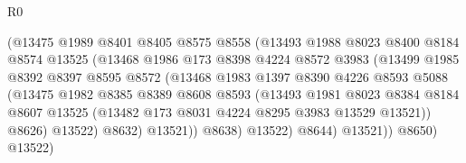 \begin{lexlean}{R0}
\begin{coremodule}
                                (@13475
                                  @1989
                                  @8401
                                  @8405
                                  @8575
                                  @8558
                                  (@13493
                                    @1988
                                    @8023
                                    @8400
                                    @8184
                                    @8574
                                    @13525
                                    (@13468
                                      @1986
                                      @173
                                      @8398
                                      @4224
                                      @8572
                                      @3983
                                      (@13499
                                        @1985
                                        @8392
                                        @8397
                                        @8595
                                        @8572
                                        (@13468
                                          @1983
                                          @1397
                                          @8390
                                          @4226
                                          @8593
                                          @5088
                                          (@13475
                                            @1982
                                            @8385
                                            @8389
                                            @8608
                                            @8593
                                            (@13493
                                              @1981
                                              @8023
                                              @8384
                                              @8184
                                              @8607
                                              @13525
                                              (@13482 @173 @8031 @4224 @8295 @3983 @13529 @13521))
                                            @8626)
                                          @13522)
                                        @8632)
                                      @13521))
                                  @8638)
                                @13522)
                              @8644)
                            @13521))
                        @8650)
                      @13522)

\end{coremodule}
\end{lexlean}
